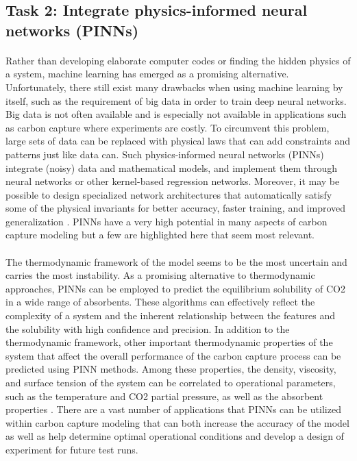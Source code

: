 \documentclass[12pt, letterpaper]{article}
\begin{document}
\subsection{Task 2: Integrate physics-informed neural networks (PINNs)}

\paragraph{}
Rather than developing elaborate computer codes or finding the hidden physics of a system, machine learning has emerged as a promising alternative. Unfortunately, there still exist many drawbacks when using machine learning by itself, such as the requirement of big data in order to train deep neural networks. Big data is not often available and is especially not available in applications such as carbon capture where experiments are costly. To circumvent this problem, large sets of data can be replaced with physical laws that can add constraints and patterns just like data can. Such physics-informed neural networks (PINNs) integrate (noisy) data and mathematical models, and implement them through neural networks or other kernel-based regression networks. Moreover, it may be possible to design specialized network architectures that automatically satisfy some of the physical invariants for better accuracy, faster training, and improved generalization \cite{Karniadakis2021}.  PINNs have a very high potential in many aspects of carbon capture modeling but a few are highlighted here that seem most relevant. 

\paragraph{}
The thermodynamic framework of the model seems to be the most uncertain and carries the most instability. As a promising alternative to thermodynamic approaches, PINNs can be employed to predict the equilibrium solubility of CO2 in a wide range of absorbents. These algorithms can effectively reflect the complexity of a system and the inherent relationship between the features and the solubility with high confidence and precision. In addition to the thermodynamic framework, other important thermodynamic properties of the system that affect the overall performance of the carbon capture process can be predicted using PINN methods. Among these properties, the density, viscosity, and surface tension of the system can be correlated to operational parameters, such as the temperature and CO2 partial pressure, as well as the absorbent properties \cite{Rahimi2021}.  There are a vast number of applications that PINNs can be utilized within carbon capture modeling that can both increase the accuracy of the model as well as help determine optimal operational conditions and develop a design of experiment for future test runs. 
\end{document}
